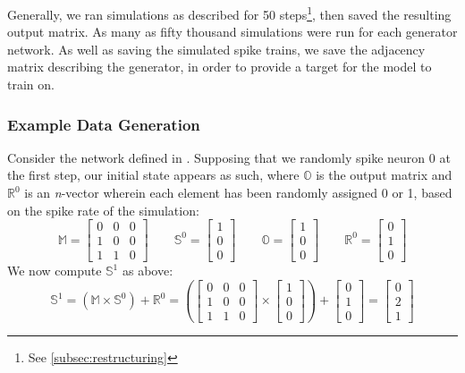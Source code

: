 Generally, we ran simulations as described for 50 steps\footnote{See 
\ref{subsec:restructuring}}, then saved the resulting output matrix. As many as 
fifty thousand simulations were run for each generator network.
As well as saving the simulated spike trains, we save the adjacency matrix 
describing the generator, in order to provide a target for the model to train 
on.

\subsubsection{Example Data Generation}
Consider the network defined in . Supposing that we randomly 
spike neuron 0 at the first step, our initial state appears as such, where 
$\mathbb{O}$ is the output matrix and $\mathbb{R}^0$ is an \textit{n}-vector 
wherein each element has been randomly assigned 0 or 1, based on the spike rate 
of the simulation:
\[
	\mathbb{M} = \begin{bmatrix}
		0 & 0 & 0 \\
		1 & 0 & 0 \\
		1 & 1 & 0
	\end{bmatrix} \qquad
	\mathbb{S}^0 = \begin{bmatrix} 1 \\ 0 \\ 0 \end{bmatrix} \qquad
	\mathbb{O} = \begin{bmatrix} 1 \\ 0 \\ 0 \end{bmatrix} \qquad
	\mathbb{R}^0 = \begin{bmatrix} 0 \\ 1 \\ 0 \end{bmatrix}
\]
We now compute $\mathbb{S}^1$ as above:
\[
	\mathbb{S}^1 = (\mathbb{M} \times \mathbb{S}^0) + \mathbb{R}^0 = 
		\left(\begin{bmatrix}
		0 & 0 & 0 \\
		1 & 0 & 0 \\
		1 & 1 & 0
	\end{bmatrix} \times \begin{bmatrix} 1 \\ 0 \\ 0 \end{bmatrix}\right)
	+ \begin{bmatrix} 0 \\ 1 \\ 0 \end{bmatrix}
	= \begin{bmatrix} 0 \\ 2 \\ 1 \end{bmatrix}
\]
